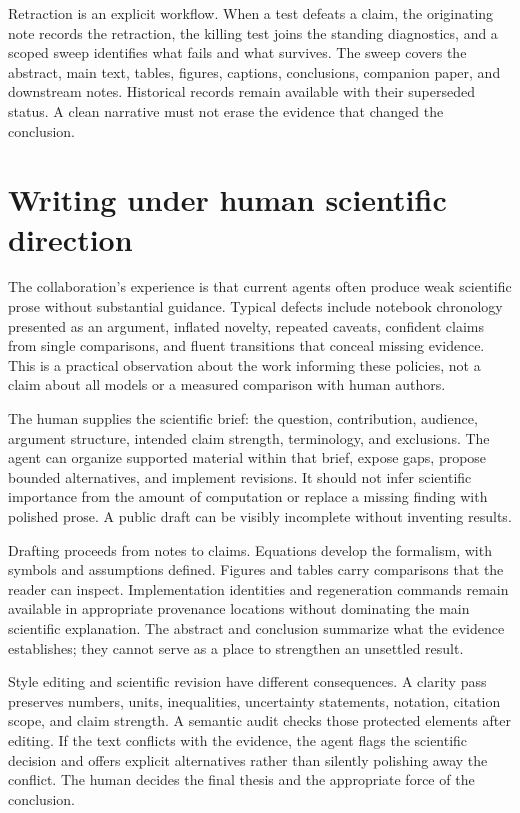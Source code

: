 \documentclass{article}
\begin{document}
Retraction is an explicit workflow. When a test defeats a claim, the originating note records the retraction, the killing test joins the standing diagnostics, and a scoped sweep identifies what fails and what survives. The sweep covers the abstract, main text, tables, figures, captions, conclusions, companion paper, and downstream notes. Historical records remain available with their superseded status. A clean narrative must not erase the evidence that changed the conclusion.

\section{Writing under human scientific direction}
The collaboration's experience is that current agents often produce weak scientific prose without substantial guidance. Typical defects include notebook chronology presented as an argument, inflated novelty, repeated caveats, confident claims from single comparisons, and fluent transitions that conceal missing evidence. This is a practical observation about the work informing these policies, not a claim about all models or a measured comparison with human authors.

The human supplies the scientific brief: the question, contribution, audience, argument structure, intended claim strength, terminology, and exclusions. The agent can organize supported material within that brief, expose gaps, propose bounded alternatives, and implement revisions. It should not infer scientific importance from the amount of computation or replace a missing finding with polished prose. A public draft can be visibly incomplete without inventing results.

Drafting proceeds from notes to claims. Equations develop the formalism, with symbols and assumptions defined. Figures and tables carry comparisons that the reader can inspect. Implementation identities and regeneration commands remain available in appropriate provenance locations without dominating the main scientific explanation. The abstract and conclusion summarize what the evidence establishes; they cannot serve as a place to strengthen an unsettled result.

Style editing and scientific revision have different consequences. A clarity pass preserves numbers, units, inequalities, uncertainty statements, notation, citation scope, and claim strength. A semantic audit checks those protected elements after editing. If the text conflicts with the evidence, the agent flags the scientific decision and offers explicit alternatives rather than silently polishing away the conflict. The human decides the final thesis and the appropriate force of the conclusion.
\end{document}

